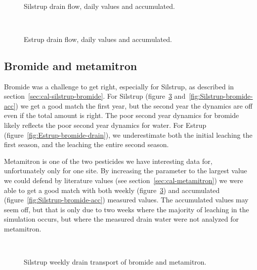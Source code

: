 \begin{figure}[htbp]
  \begin{center}
    \\
  \end{center}
  \caption{Silstrup drain flow, daily values and accumulated.}
  \label{fig:Silstrup-drain}
\end{figure}

\begin{figure}[htbp]
  \begin{center}
    \\
  \end{center}
  \caption{Estrup drain flow, daily values and accumulated.}
  \label{fig:Estrup-drain}
\end{figure}

\FloatBarrier
\subsection{Bromide and metamitron}

Bromide was a challenge to get right, especially for Silstrup, as
described in section~\ref{sec:cal-silstrup-bromide}.  For Silstrup
(figure~\ref{fig:Silstrup-weekly} and~\ref{fig:Silstrup-bromide-acc})
we get a good match the first year, but the second year the dynamics
are off even if the total amount is right.  The poor second year
dynamics for bromide likely reflects the poor second year dynamics for
water.  For Estrup (figure~\ref{fig:Estrup-bromide-drain}), we
underestimate both the initial leaching the first season, and the
leaching the entire second season.

Metamitron is one of the two pesticides we have interesting data for,
unfortunately only for one site.  By increasing the \kd{} parameter to
the largest value we could defend by literature values (see
section~\ref{sec:cal-metamitron}) we were able to get a good match
with both weekly (figure~\ref{fig:Silstrup-weekly}) and accumulated
(figure~\ref{fig:Silstrup-bromide-acc}) measured values.  The
accumulated values may seem off, but that is only due to two weeks
where the majority of leaching in the simulation occurs, but where the
measured drain water were not analyzed for metamitron.

\begin{figure}[htbp]
  \begin{center}
    \\
  \end{center}
  \caption{Silstrup weekly drain transport of bromide and metamitron.}
  \label{fig:Silstrup-weekly}
\end{figure}

